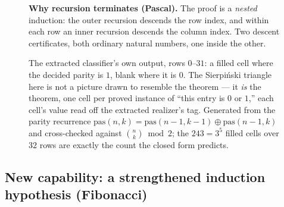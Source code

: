 \documentclass[11pt]{article}
\begin{document}
\begin{figure}[h]
\centering
{}
\caption{\textbf{Why recursion terminates (Pascal).} The proof is a
\emph{nested} induction: the outer recursion descends the row index, and within
each row an inner recursion descends the column index. Two descent
certificates, both ordinary natural numbers, one inside the other.}
\label{fig:desc-pascal}
\end{figure}

\begin{figure}[h]
\centering
\begin{tikzpicture}

\end{tikzpicture}
\caption{The extracted classifier's own output, rows $0$--$31$: a filled cell
where the decided parity is $1$, blank where it is $0$. The Sierpi\'nski
triangle here is not a picture drawn to resemble the theorem --- it \emph{is}
the theorem, one cell per proved instance of ``this entry is $0$ or $1$,'' each
cell's value read off the extracted realizer's tag. Generated from the parity
recurrence $\mathrm{pas}(n,k)=\mathrm{pas}(n{-}1,k{-}1)\oplus\mathrm{pas}(n{-}1,k)$
and cross-checked against $\binom{n}{k}\bmod 2$; the $243=3^5$ filled cells over
$32$ rows are exactly the count the closed form predicts.}
\label{fig:sierpinski}
\end{figure}

\subsection*{New capability: a strengthened induction hypothesis (Fibonacci)}
\end{document}
